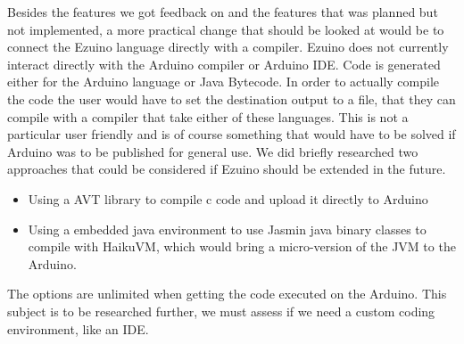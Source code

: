 Besides the features we got feedback on and the features that was planned but not implemented, a more practical change that should be looked at would be to connect the Ezuino language directly with a compiler. Ezuino does not currently interact directly with the Arduino compiler or Arduino IDE. Code is generated either for the Arduino language or Java Bytecode. In order to actually compile the code the user would have to set the destination output to a file, that they can compile with a compiler that take either of these languages. This is not a particular user friendly and is of course something that would have to be solved if Arduino was to be published for general use. We did briefly researched two approaches that could be considered if Ezuino should be extended in the future.
\begin{itemize}
    \item Using a AVT library to compile c code and upload it directly to Arduino
    \item Using a embedded java environment to use Jasmin java binary classes to compile with HaikuVM\cite{haiku}, which would bring a micro-version of the JVM to the Arduino.
\end{itemize}
The options are unlimited when getting the code executed on the Arduino. This subject is to be researched further, we must assess if we need a custom coding environment, like an IDE.




